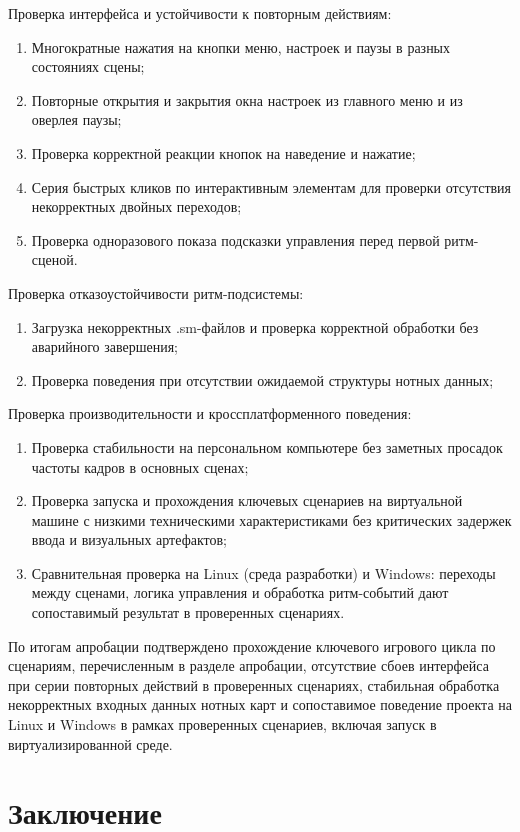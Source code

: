 \documentclass[utf8, russian]{eskdtext}
\numberwithin{equation}{section}
\let\stdsection\section
\renewcommand \section{\newpage\stdsection}
\begin{document}
Проверка интерфейса и устойчивости к повторным действиям:
\begin{enumerate}
    \item Многократные нажатия на кнопки меню, настроек и паузы в разных состояниях сцены;
    \item Повторные открытия и закрытия окна настроек из главного меню и из оверлея паузы;
    \item Проверка корректной реакции кнопок на наведение и нажатие;
    \item Серия быстрых кликов по интерактивным элементам для проверки отсутствия некорректных двойных переходов;
    \item Проверка одноразового показа подсказки управления перед первой ритм-сценой.
\end{enumerate}

Проверка отказоустойчивости ритм-подсистемы:
\begin{enumerate}
    \item Загрузка некорректных .sm-файлов и проверка корректной обработки без аварийного завершения;
    \item Проверка поведения при отсутствии ожидаемой структуры нотных данных;
\end{enumerate}

Проверка производительности и кроссплатформенного поведения:
\begin{enumerate}
    \item Проверка стабильности на персональном компьютере без заметных просадок частоты кадров в основных сценах;
    \item Проверка запуска и прохождения ключевых сценариев на виртуальной машине с низкими техническими характеристиками без критических задержек ввода и визуальных артефактов;
    \item Сравнительная проверка на Linux (среда разработки) и Windows: переходы между сценами, логика управления и обработка ритм-событий дают сопоставимый результат в проверенных сценариях.
\end{enumerate}

По итогам апробации подтверждено прохождение ключевого игрового цикла по сценариям, перечисленным в разделе апробации, отсутствие сбоев интерфейса при серии повторных действий в проверенных сценариях, стабильная обработка некорректных входных данных нотных карт и сопоставимое поведение проекта на Linux и Windows в рамках проверенных сценариев, включая запуск в виртуализированной среде.

\section*{Заключение}
\end{document}
